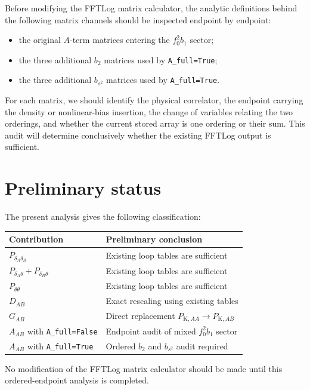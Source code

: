 \documentclass[11pt,a4paper]{article}
\begin{document}
Before modifying the FFTLog matrix calculator, the analytic definitions behind the following matrix channels should be inspected endpoint by endpoint:
\begin{itemize}[leftmargin=1.5em]
    \item the original $A$-term matrices entering the $f_0^2b_1$ sector;
    \item the three additional $b_2$ matrices used by \texttt{A\_full=True};
    \item the three additional $b_{s^2}$ matrices used by \texttt{A\_full=True}.
\end{itemize}
For each matrix, we should identify the physical correlator, the endpoint carrying the density or nonlinear-bias insertion, the change of variables relating the two orderings, and whether the current stored array is one ordering or their sum. This audit will determine conclusively whether the existing FFTLog output is sufficient.

\section{Preliminary status}

The present analysis gives the following classification:
\begin{center}
\begin{tabular}{@{}ll@{}}
\toprule
Contribution & Preliminary conclusion \\
\midrule
$P_{\delta_A\delta_B}$ & Existing loop tables are sufficient \\
$P_{\delta_A\theta}+P_{\delta_B\theta}$ & Existing loop tables are sufficient \\
$P_{\theta\theta}$ & Existing loop tables are sufficient \\
$D_{AB}$ & Exact rescaling using existing tables \\
$G_{AB}$ & Direct replacement $P_{\mathrm{K},AA}\to P_{\mathrm{K},AB}$ \\
$A_{AB}$ with \texttt{A\_full=False} & Endpoint audit of mixed $f_0^2b_1$ sector \\
$A_{AB}$ with \texttt{A\_full=True} & Ordered $b_2$ and $b_{s^2}$ audit required \\
\bottomrule
\end{tabular}
\end{center}
No modification of the FFTLog matrix calculator should be made until this ordered-endpoint analysis is completed.
\end{document}
